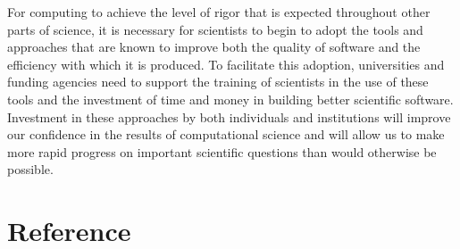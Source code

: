 \documentclass[10pt]{article}
\begin{document}
For computing to achieve the level of rigor that is expected
throughout other parts of science, it is necessary for scientists to
begin to adopt the tools and approaches that are known to improve both
the quality of software and the efficiency with which it is
produced. To facilitate this adoption, universities and funding
agencies need to support the training of scientists in the use of
these tools and the investment of time and money in building better
scientific software. Investment in these approaches by both
individuals and institutions will improve our confidence in the
results of computational science and will allow us to make more rapid
progress on important scientific questions than would otherwise be
possible.



\pagebreak

\section*{Reference}
\end{document}
